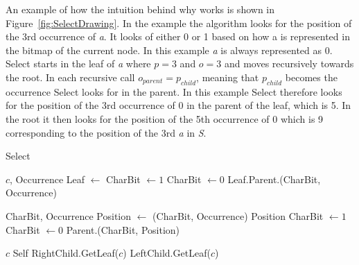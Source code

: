 An example of how the intuition behind why  works is shown in Figure~\ref{fig:SelectDrawing}.
In the example the algorithm looks for the position of the 3rd occurrence of \textit{a}.
It looks of either 0 or 1 based on how a is represented in the bitmap of the current node. In this example \textit{a} is always represented as 0.
Select starts in the leaf of \textit{a} where $p = 3$ and $o = 3$ and moves recursively towards the root. In each recursive call $o_{parent} = p_{child}$, meaning that $p_{child}$ becomes the occurrence Select looks for in the parent. In this example Select therefore looks for the position of the 3rd occurrence of 0 in the parent of the leaf, which is 5. In the root it then looks for the position of the 5th occurrence of 0 which is 9 corresponding to the position of the 3rd \textit{a} in \textit{S}.

\begin{algorithm}
\caption{Select}
\label{alg:select}
\begin{algorithmic} 
 {$c$, Occurrence}
\State Leaf $\gets$ 
	\State CharBit $\gets 1$
\Else
	\State CharBit $\gets 0$
\EndIf
\State \Return Leaf.Parent.(CharBit, Occurrence)
\EndFunction

\vspace{5mm}

 {CharBit, Occurrence}
\State Position $\gets$ (CharBit, Occurrence)
	\State \Return Position
\EndIf
{}
	\State CharBit $\gets 1$
\Else
	\State CharBit $\gets 0$
\EndIf
\State \Return Parent.(CharBit, Position)
\EndFunction

\vspace{5mm}

 {$c$}
	\State \Return Self
\EndIf
{}
	\State \Return RightChild.GetLeaf($c$)
\Else
	\State \Return LeftChild.GetLeaf($c$)
\EndIf
\EndFunction
\end{algorithmic}
\end{algorithm}

